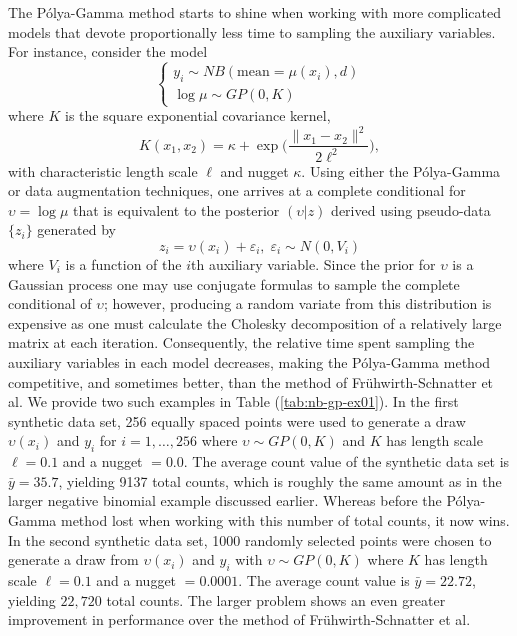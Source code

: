 \documentclass[11pt]{article}
\newcommand{\ep}{\varepsilon}
\newcommand{\Polya}{P\'{o}lya}
\begin{document}
The \Polya-Gamma method starts to shine when working with more complicated
models that devote proportionally less time to sampling the auxiliary variables.
For instance, consider the model
\[
\begin{cases}
y_i \sim NB(\text{mean} = \mu(x_i), d) \\
\log \mu  \sim GP(0, K)
\end{cases}
\]
where $K$ is the square exponential covariance kernel,
\[
K(x_1,x_2) = \kappa + \exp \Big( \frac{\|x_1 - x_2\|^2}{2 \ell^2} \Big),
\]
with characteristic length scale $\ell$ and nugget $\kappa$.  Using either the
\Polya-Gamma or \cite{fruhwirth-schnatter-etal-2009} data augmentation
techniques, one arrives at a complete conditional for $\upsilon = \log \mu$ that
is equivalent to the posterior $(\upsilon | z)$ derived using pseudo-data
$\{z_i\}$ generated by
\[
z_i = \upsilon(x_i) + \ep_i, \; \ep_i \sim N(0, V_i)
\]
where $V_i$ is a function of the $i$th auxiliary variable.  Since the prior for
$\upsilon$ is a Gaussian process one may use conjugate formulas to sample the
complete conditional of $\upsilon$; however, producing a random variate from
this distribution is expensive as one must calculate the Cholesky decomposition
of a relatively large matrix at each iteration.  Consequently, the relative time
spent sampling the auxiliary variables in each model decreases, making the
\Polya-Gamma method competitive, and sometimes better, than the method of
Fr\"{u}hwirth-Schnatter et al.  We provide two such examples in Table
(\ref{tab:nb-gp-ex01}).  In the first synthetic data set, 256 equally spaced
points were used to generate a draw $\upsilon(x_i)$ and $y_i$ for $i=1, \ldots,
256$ where $\upsilon \sim GP(0, K)$ and $K$ has length scale $\ell = 0.1$ and a
nugget $=0.0$.  The average count value of the synthetic data set is $\bar y =
35.7$, yielding 9137 total counts, which is roughly the same amount as in the
larger negative binomial example discussed earlier.  Whereas before the
\Polya-Gamma method lost when working with this number of total counts, it now
wins.  In the second synthetic data set, 1000 randomly selected points were
chosen to generate a draw from $\upsilon(x_i)$ and $y_i$ with $\upsilon \sim
GP(0, K)$ where $K$ has length scale $\ell = 0.1$ and a nugget $=0.0001$.  The
average count value is $\bar y = 22.72$, yielding $22,720$ total counts.  The
larger problem shows an even greater improvement in performance over the method
of Fr\"{u}hwirth-Schnatter et al.
\end{document}
